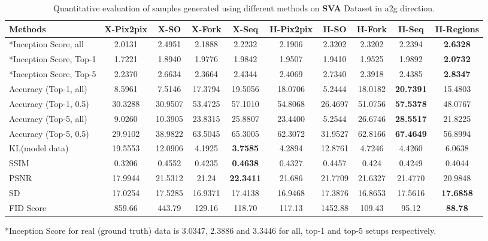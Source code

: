 \documentclass[times,twocolumn,final,authoryear]{elsarticle_modified}
\begin{document}
\begin{table*}[htbp]
 \small
   \renewcommand{\arraystretch}{.8}
  \centering
\caption{\small Quantitative evaluation of samples generated using different methods on {\bf SVA} Dataset in a2g direction.}
  \vspace{-10pt}
  \label{tab:sva_quant}
  
    \begin{tabular*}{\textwidth}{l @{\extracolsep{\fill}} cccc|cccc|c}
        \toprule  
 \textbf{Methods} & X-Pix2pix & X-SO & X-Fork & X-Seq & H-Pix2pix & H-SO & H-Fork & H-Seq & H-Regions \\
     \midrule
*Inception Score, all  & {2.0131} & {2.4951} & {2.1888} & {2.2232}  & {2.1906} & 2.3202 & {2.3202}  & 2.2394 & \textbf{2.6328} \\
*Inception Score, Top-1  & {1.7221} & {1.8940} & {1.9776} & {1.9842}  & {1.9507} & 1.9410 & {1.9525}  & 1.9892  & \textbf{2.0732} \\
*Inception Score, Top-5  & {2.2370} & {2.6634} & {2.3664} & {2.4344}  & {2.4069} & 2.7340  & {2.3918}  & 2.4385 & \textbf{2.8347} \\

          \midrule
Accuracy (Top-1, all)  & {8.5961} & {7.5146} & {17.3794} & {19.5056}  & {18.0706} & 5.2444 & {18.0182}  & \textbf{20.7391}  & 15.4803 \\ 
 Accuracy (Top-1, 0.5)  & {30.3288} & {30.9507} & {53.4725} & {57.1010}  & {54.8068} & 26.4697 & {51.0756}  & \textbf{57.5378}  & 48.0767 \\ 
Accuracy (Top-5, all)  & {9.0260} & {10.3905} & {23.8315} & {25.8807}  & {23.4400} & 5.2544  & {26.6746}  & \textbf{28.5517} & 21.8225 \\ 
 Accuracy (Top-5, 0.5)  & {29.9102} & {38.9822} & {63.5045} & {65.3005}  & {62.3072} & 31.9527  & {62.8166}  & \textbf{67.4649} & 56.8994 \\ 
 
          \midrule
KL(model   data)  & {19.5553}  & {12.0906} & {4.1925} & \textbf{3.7585} & {4.2894} & 12.8761 & {4.7246}  & 4.4260  & 6.0638 \\ 

\midrule
SSIM  & {0.3206} & {0.4552} & {0.4235} & \textbf{0.4638}  & {0.4327} & 0.4457 & {0.424}  & 0.4249 & 0.4044 \\
PSNR  & {17.9944} & 21.5312 & {21.24} & \textbf{22.3411}  & 21.686 & 21.7709 & 21.6327  & 21.4770  & 20.9848 \\
SD  & {17.0254} & 17.5285 & 16.9371 & {17.4138}  & 16.9468 & {17.3876} & 16.8653  & 17.5616 & \textbf{17.6858}\\
\midrule
FID Score  & {859.66} & {443.79} & {129.16} & {118.70}  & {117.13} & {1452.88} &  {109.43} & 95.12 & \textbf{88.78}  \\

        \bottomrule
\end{tabular*}
{*Inception Score for real (ground truth) data is 3.0347, 2.3886 and 3.3446 for all, top-1 and top-5 setups respectively.}
\vspace{-10pt}
\end{table*}  
\end{document}
